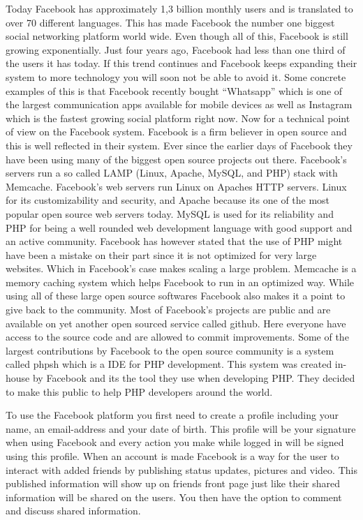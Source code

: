 \documentclass[conference]{IEEEtran}
\begin{document}
Today Facebook has approximately 1,3 billion monthly users and is translated to over 70 different languages.\cite{StatisticBrain} This has made Facebook the number one biggest social networking platform world wide. Even though all of this, Facebook is still growing exponentially. Just four years ago, Facebook had less than one third of the users it has today. If this trend continues and Facebook keeps expanding their system to more technology you will soon not be able to avoid it. Some concrete examples of this is that Facebook recently bought “Whatsapp” which is one of the largest communication apps available for mobile devices as well as Instagram which is the fastest growing social platform right now. \cite{KateKnibbs2014}
Now for a technical point of view on the Facebook system. Facebook is a firm believer in open source and this is well reflected in their system. Ever since the earlier days of Facebook they have been using many of the biggest open source projects out there.
Facebook’s servers run a  so called LAMP (Linux, Apache, MySQL, and PHP) stack with Memcache. Facebook’s web servers run Linux on Apaches HTTP servers. Linux for its customizability and security, and Apache because its one of the most popular open source web servers today. MySQL is used for its reliability and PHP for being a well rounded web development language with good support and an active community. Facebook has however stated that the use of PHP might have been a mistake on their part since it is not optimized for very large websites. Which in Facebook’s case makes scaling a large problem.
Memcache is a memory caching system which helps Facebook to run in an optimized way.
\cite{SteveKampbel2010}
While using all of these large open source softwares Facebook also makes it a point to give back to the community. Most of Facebook’s projects are public and are available on yet another open sourced service called github. Here everyone have access to the source code and are allowed to commit improvements. Some of the largest contributions by Facebook to the open source community is a system called phpsh which is a IDE for PHP development. This system was created in-house by Facebook and its the tool they use when developing PHP. They decided to make this public to help PHP developers around the world. \cite{SteveGrimm2006}

To use the Facebook platform you first need to create a profile including your name, an email-address and your date of birth. This profile will be your signature when using Facebook and every action you make while logged in will be signed using this profile.
When an account is made Facebook is a way for the user to interact with added friends by publishing status updates, pictures and video. This published information will show up on friends front page just like their shared information will be shared on the users. You then have the option to comment and discuss shared information.
\end{document}
